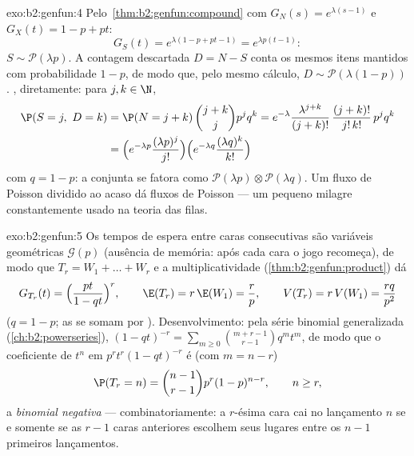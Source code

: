 \begin{solution}{exo:b2:genfun:4}
Pelo~\cref{thm:b2:genfun:compound} com $G_N(s) = e^{\lambda(s-1)}$
e $G_X(t) = 1 - p + pt$:
\[
G_S(t) = e^{\lambda(1 - p + pt - 1)} = e^{\lambda p(t - 1)} :
\]
$S \sim \mathcal{P}(\lambda p)$. A contagem descartada $D = N - S$
conta os mesmos itens mantidos com probabilidade $1 - p$, de modo que, pelo
mesmo cálculo, $D \sim \mathcal{P}(\lambda(1 - p))$.
, diretamente: para $j, k \in \N$,
\begin{align*}
\P(S = j,\ D = k)
&= \P(N = j + k)\,\binom{j+k}{j}p^jq^k
= e^{-\lambda}\frac{\lambda^{j+k}}{(j+k)!}\,
\frac{(j+k)!}{j!\,k!}\,p^jq^k\\
&= \Bigl(e^{-\lambda p}\frac{(\lambda p)^j}{j!}\Bigr)
\Bigl(e^{-\lambda q}\frac{(\lambda q)^k}{k!}\Bigr)
\end{align*}
com $q = 1 - p$: a  conjunta se fatora como
$\mathcal{P}(\lambda p) \otimes \mathcal{P}(\lambda q)$. Um fluxo de
Poisson dividido ao acaso dá fluxos de Poisson \emph{} ---
um pequeno milagre constantemente usado na teoria das filas.
\end{solution}

\begin{solution}{exo:b2:genfun:5}
Os tempos de espera entre caras consecutivas são variáveis geométricas
$\mathcal{G}(p)$  (ausência de memória: após cada
cara o jogo recomeça), de modo que $T_r = W_1 + \dots + W_r$ e a
multiplicatividade (\cref{thm:b2:genfun:product}) dá
\[
G_{T_r}(t) = \Bigl(\frac{pt}{1 - qt}\Bigr)^{r},
\qquad
\E(T_r) = r\,\E(W_1) = \frac rp,
\qquad
V(T_r) = r\,V(W_1) = \frac{rq}{p^2}
\]
($q = 1 - p$; as  se somam por ). Desenvolvimento: pela
série binomial generalizada
(\cref{ch:b2:powerseries}), $(1 - qt)^{-r} = \sum_{m\geq0}
\binom{m + r - 1}{r - 1}q^mt^m$, de modo que o coeficiente de $t^n$ em
$p^rt^r(1 - qt)^{-r}$ é (com $m = n - r$)
\[
\P(T_r = n) = \binom{n-1}{r-1}p^r(1-p)^{n-r},
\qquad n \geq r ,
\]
a  \emph{binomial negativa} --- combinatoriamente: a $r$-ésima
cara cai no lançamento $n$ se e somente se as $r - 1$ caras anteriores escolhem seus
lugares entre os $n - 1$ primeiros lançamentos.
\end{solution}

